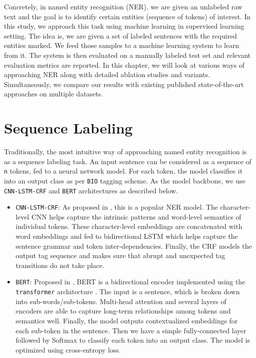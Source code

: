 Concretely, in named entity recognition (NER), we are given an unlabeled raw text and the goal is to identify certain entities (sequence of tokens) of interest. In this study, we approach this task using machine learning in supervised learning setting. The idea is, we are given a set of labeled sentences with the required entities marked. We feed those samples to a machine learning system to learn from it. The system is then evaluated on a manually labeled test set and relevant evaluation metrics are reported. In this chapter, we will look at various ways of approaching NER along with detailed ablation studies and variants. Simultaneously, we compare our results with existing published state-of-the-art approaches on multiple datasets.

\section{Sequence Labeling}
Traditionally, the most intuitive way of approaching named entity recognition is as a sequence labeling task. An input sentence can be considered as a sequence of \texttt{n} tokens, fed to a neural network model. For each token, the model classifies it into an output class as per \texttt{BIO} tagging scheme. As the model backbone, we use \texttt{CNN-LSTM-CRF} and \texttt{BERT} architectures as described below.

\begin{itemize}
    \item \texttt{CNN-LSTM-CRF}: As proposed in \cite{ma2016end}, this is a popular NER model. The character-level CNN helps capture the intrinsic patterns and word-level semantics of individual tokens. These character-level embeddings are concatenated with word embeddings and fed to bidirectional LSTM\cite{} which helps capture the sentence grammar and token inter-dependencies. Finally, the CRF models the output tag sequence and makes sure that abrupt and unexpected tag transitions do not take place. 
    
    \item \texttt{BERT}: Proposed in \cite{devlin2018bert}, BERT is a bidirectional encoder implemented using the \texttt{transformer} architecture \cite{}. The input is a sentence, which is broken down into sub-words/sub-tokens. Multi-head attention and several layers of encoders are able to capture long-term relationships among tokens and semantics well. Finally, the model outputs contextualized embeddings for each sub-token in the sentence. Then we have a simple fully-connected layer followed by Softmax to classify each token into an output class. The model is optimized using cross-entropy loss.
\end{itemize}

